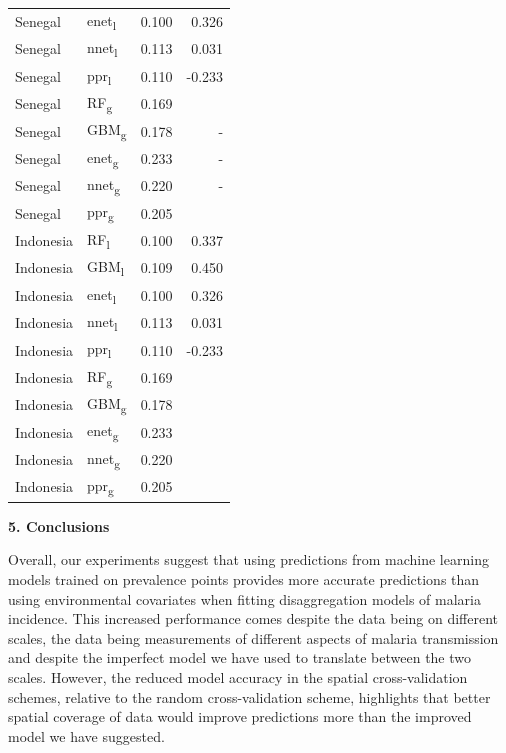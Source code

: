 \documentclass[11pt]{article}
\begin{document}
\begin{table}
\begin{tabular}{ll|rr}
Senegal & enet\textsubscript{l} & 0.100 & 0.326 \\
Senegal & nnet\textsubscript{l} & 0.113 & 0.031 \\
Senegal & ppr\textsubscript{l} & 0.110 & -0.233\vspace{0.3cm}\\
Senegal & RF\textsubscript{g} & 0.169 & \\
Senegal & GBM\textsubscript{g} & 0.178 & - \\
Senegal & enet\textsubscript{g} & 0.233 & - \\
Senegal & nnet\textsubscript{g} & 0.220 & - \\
Senegal & ppr\textsubscript{g} & 0.205 & \vspace{0.3cm} \\ 
Indonesia & RF\textsubscript{l} & 0.100 & 0.337 \\
Indonesia & GBM\textsubscript{l} & 0.109 & 0.450 \\
Indonesia & enet\textsubscript{l} & 0.100 & 0.326\\
Indonesia & nnet\textsubscript{l} & 0.113 & 0.031 \\
Indonesia & ppr\textsubscript{l} & 0.110 & -0.233\vspace{0.3cm}\\
Indonesia & RF\textsubscript{g} & 0.169 & \\
Indonesia & GBM\textsubscript{g} & 0.178 & \\
Indonesia & enet\textsubscript{g} &0.233  &\\
Indonesia & nnet\textsubscript{g} &0.220  &\\
Indonesia & ppr\textsubscript{g} & 0.205 &  \\
\end{tabular}
\label{t:mlresults}
\end{table}


{\bf 5. Conclusions}

Overall, our experiments suggest that using predictions from machine learning models trained on prevalence points provides more accurate predictions than using environmental covariates when fitting disaggregation models of malaria incidence.
This increased performance comes despite the data being on different scales, the data being measurements of different aspects of malaria transmission and despite the imperfect model we have used to translate between the two scales.
However, the reduced model accuracy in the spatial cross-validation schemes, relative to the random cross-validation scheme, highlights that better spatial coverage of data would improve predictions more than the improved model we have suggested.
\end{document}
